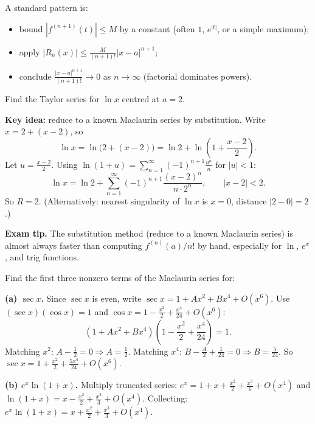 \begin{examtip}[title={Exam Focus: proving $R_n(x)\to 0$ quickly}]
A standard pattern is:
\begin{itemize}[leftmargin=*]
\item bound $|f^{(n+1)}(t)|\le M$ by a constant (often $1$, $e^{|t|}$, or a simple maximum);
\item apply $|R_n(x)|\le \frac{M}{(n+1)!}|x-a|^{n+1}$;
\item conclude $\frac{|x-a|^{n+1}}{(n+1)!}\to 0$ as $n\to\infty$ (factorial dominates powers).
\end{itemize}
\end{examtip}

\begin{examplebox}[title={Worked Example: Taylor series at $a\neq 0$ via substitution (Tutorial~12, Q1(a))}]
Find the Taylor series for $\ln x$ centred at $a=2$.

\smallskip
\textbf{Key idea:} reduce to a known Maclaurin series by substitution.
Write $x=2+(x-2)$, so
\[
\ln x = \ln\bigl(2+(x-2)\bigr) = \ln 2 + \ln\!\left(1+\frac{x-2}{2}\right).
\]
Let $u=\frac{x-2}{2}$. Using $\ln(1+u)=\sum_{n=1}^{\infty}(-1)^{n+1}\frac{u^n}{n}$ for $|u|<1$:
\[
\ln x = \ln 2 + \sum_{n=1}^{\infty}(-1)^{n+1}\frac{(x-2)^n}{n\cdot 2^n},
\qquad |x-2|<2.
\]
So $R=2$. (Alternatively: nearest singularity of $\ln x$ is $x=0$, distance $|2-0|=2$.)

\smallskip
\textbf{Exam tip.} The substitution method (reduce to a known Maclaurin series) is almost always faster than computing $f^{(n)}(a)/n!$ by hand, especially for $\ln$, $e^x$, and trig functions.
\end{examplebox}

\begin{examplebox}[title={Worked Example: first three nonzero Maclaurin terms (Tutorial~12, Q3)}]
Find the first three nonzero terms of the Maclaurin series for:

\smallskip
\textbf{(a) $\sec x$.}
Since $\sec x$ is even, write $\sec x=1+Ax^2+Bx^4+O(x^6)$.
Use $(\sec x)(\cos x)=1$ and $\cos x=1-\frac{x^2}{2}+\frac{x^4}{24}+O(x^6)$:
\[
(1+Ax^2+Bx^4)\!\left(1-\frac{x^2}{2}+\frac{x^4}{24}\right)=1.
\]
Matching $x^2$: $A-\frac12=0\Rightarrow A=\frac12$.
Matching $x^4$: $B-\frac{A}{2}+\frac{1}{24}=0\Rightarrow B=\frac{5}{24}$.
So $\sec x=1+\frac{x^2}{2}+\frac{5x^4}{24}+O(x^6)$.

\smallskip
\textbf{(b) $e^x\ln(1+x)$.}
Multiply truncated series:
$e^x=1+x+\frac{x^2}{2}+\frac{x^3}{6}+O(x^4)$ and $\ln(1+x)=x-\frac{x^2}{2}+\frac{x^3}{3}+O(x^4)$.
Collecting:
$e^x\ln(1+x)=x+\frac{x^2}{2}+\frac{x^3}{3}+O(x^4)$.
\end{examplebox}

